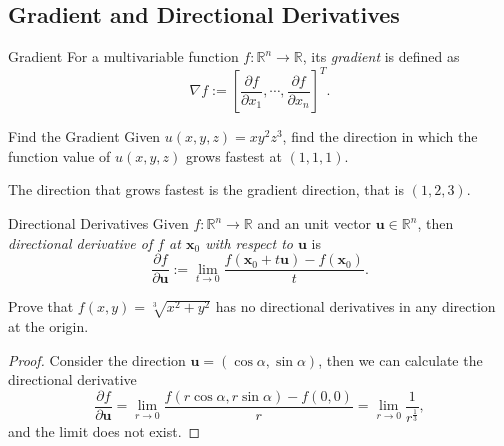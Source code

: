 \subsection{Gradient and Directional Derivatives}

\begin{definition}{Gradient}{}
  For a multivariable function $f: \mathbb{R}^n \rightarrow \mathbb{R}$,
  its \emph{gradient} is defined as
  \begin{equation}
    \nabla f := \left[ \frac{\partial f}{\partial x_1},\cdots,\frac{\partial f}{\partial x_n} \right]^T.
  \end{equation}
\end{definition}

\begin{example}{Find the Gradient}{}
  Given $u(x,y,z) = xy^2z^3$, find the direction in which the function value of
  $u(x, y, z)$ grows fastest at $(1,1,1)$.
\end{example}

\begin{solution}
  The direction that grows fastest is the gradient direction, that is $(1,2,3)$.
\end{solution}

\begin{definition}{Directional Derivatives}{}
  Given $f: \mathbb{R}^n \rightarrow \mathbb{R}$ and an unit vector $\mathbf{u}
  \in \mathbb{R}^n$, then \emph{directional derivative of $f$ at $\mathbf{x}_0$ with respect to $\mathbf{u}$}
  is
  \begin{equation}
    \frac{\partial f}{\partial \mathbf{u}} := \lim \limits _{t \rightarrow 0} \frac{f(\mathbf{x}_0 + t\mathbf{u}) - f(\mathbf{x}_0)}{t}.
  \end{equation}
\end{definition}

\begin{example}{}{}
  Prove that $f(x,y) = \sqrt[3]{x^2 + y^2}$ has no directional derivatives in
  any direction at the origin.
\end{example}

\begin{proof}
  Consider the direction $\mathbf{u} = (\cos \alpha, \sin \alpha)$,
  then we can calculate the directional derivative
  \begin{equation}
    \frac{\partial f}{\partial \mathbf{u}}
    = \lim \limits _{r \rightarrow 0} \frac{f(r\cos \alpha, r \sin \alpha) - f(0,0)}{r}
    = \lim \limits _{r \rightarrow 0} \frac{1}{r^{\frac{1}{3}}},
  \end{equation}
  and the limit does not exist.
\end{proof}

